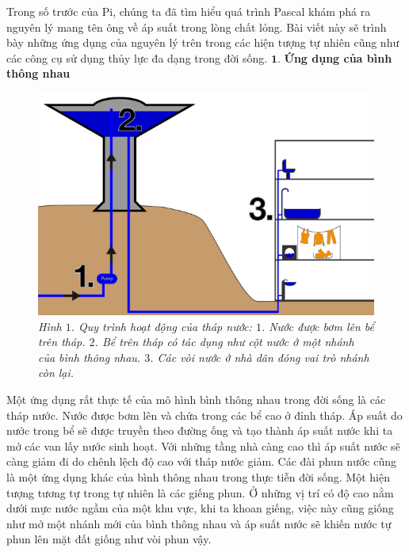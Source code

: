 \begin{multicols}{2}
	Trong số trước của Pi, chúng ta đã tìm hiểu quá trình Pascal khám phá ra nguyên lý mang tên ông về áp suất trong lòng chất lỏng. Bài viết này sẽ trình bày những ứng dụng của nguyên lý trên trong các hiện tượng tự nhiên cũng như các công cụ sử dụng thủy lực đa dạng trong đời sống.
	\vskip 0.1cm
	$\pmb{1.}$ \textbf{\color{timhieukhoahoc}Ứng dụng của bình thông nhau}
	\begin{figure}[H]
		\vspace*{-5pt}
		\centering
		\captionsetup{labelformat= empty, justification=centering}
		\includegraphics[width= 1\linewidth]{1}
		\caption{\small\textit{\color{timhieukhoahoc}Hình $1$. Quy trình hoạt động của tháp nước: $1$. Nước được bơm lên bể trên tháp. $2$. Bể trên tháp có tác dụng như cột nước ở một nhánh của bình thông nhau. $3$. Các vòi nước ở nhà dân đóng vai trò nhánh còn lại.}}
		\vspace*{-5pt}
	\end{figure}
	Một ứng dụng rất thực tế của mô hình bình thông nhau trong đời sống là các tháp nước. Nước được bơm lên và chứa trong các bể cao ở đỉnh tháp. Áp suất do nước trong bể sẽ được truyền theo đường ống và tạo thành áp suất nước khi ta mở các van lấy nước sinh hoạt. Với những tầng nhà càng cao thì áp suất nước sẽ càng giảm đi do chênh lệch độ cao với tháp nước giảm. Các đài phun nước cũng là một ứng dụng khác của bình thông nhau trong thực tiễn đời sống.
	Một hiện tượng tương tự trong tự nhiên là các giếng phun. Ở những vị trí có độ cao nằm dưới mực nước ngầm của một khu vực, khi ta khoan giếng, việc này cũng giống như mở một nhánh mới của bình thông nhau và áp suất nước sẽ khiến nước tự phun lên mặt đất giống như vòi phun vậy. 

\end{multicols}
